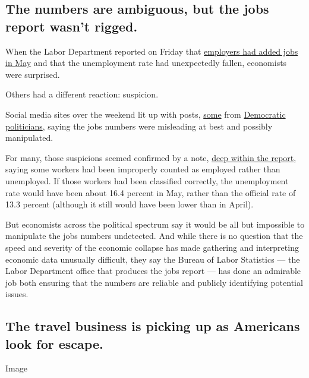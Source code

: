 \hypertarget{the-numbers-are-ambiguous-but-the-jobs-report-wasnt-rigged}{%
\subsection{The numbers are ambiguous, but the jobs report wasn't
rigged.}\label{the-numbers-are-ambiguous-but-the-jobs-report-wasnt-rigged}}

When the Labor Department reported on Friday that
\href{https://www.nytimes3xbfgragh.onion/2020/06/06/business/economy/jobs-report-minorities.html}{employers
had added jobs in May} and that the unemployment rate had unexpectedly
fallen, economists were surprised.

Others had a different reaction: suspicion.

Social media sites over the weekend lit up with posts,
\href{https://twitter.com/GovHowardDean/status/1269325065310613505?s=20}{some}
from
\href{https://twitter.com/tedlieu/status/1269140901558800385}{Democratic
politicians}, saying the jobs numbers were misleading at best and
possibly manipulated.

For many, those suspicions seemed confirmed by a note,
\href{https://www.bls.gov/news.release/empsit.nr0.htm}{deep within the
report}, saying some workers had been improperly counted as employed
rather than unemployed. If those workers had been classified correctly,
the unemployment rate would have been about 16.4 percent in May, rather
than the official rate of 13.3 percent (although it still would have
been lower than in April).

But economists across the political spectrum say it would be all but
impossible to manipulate the jobs numbers undetected. And while there is
no question that the speed and severity of the economic collapse has
made gathering and interpreting economic data unusually difficult, they
say the Bureau of Labor Statistics --- the Labor Department office that
produces the jobs report --- has done an admirable job both ensuring
that the numbers are reliable and publicly identifying potential issues.

\hypertarget{the-travel-business-is-picking-up-as-americans-look-for-escape}{%
\subsection{The travel business is picking up as Americans look for
escape.}\label{the-travel-business-is-picking-up-as-americans-look-for-escape}}

Image

